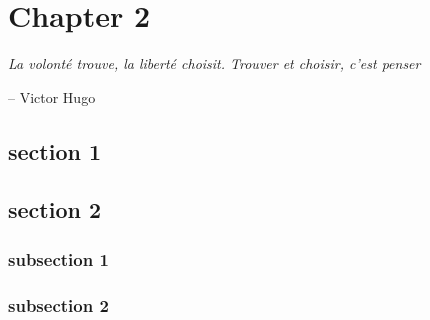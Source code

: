 \chapter{Chapter 2}
\epigraph{\itshape  La volonté trouve, la liberté choisit. Trouver et choisir, c'est penser}{-- Victor Hugo}

{
	\hypersetup{linkcolor=black}
	\startcontents[chapters]
	\printmyminitoc{
		\lipsum[1]
	}
}



\section{section 1}

\lipsum[1] \cite{imagenet_cvpr09}

\lipsum[1] \cite{KrizhevskySH12}

\section{section 2}
\lipsum[2]

\subsection{subsection 1}
\lipsum[1]
\subsection{subsection 2}
\lipsum[1]